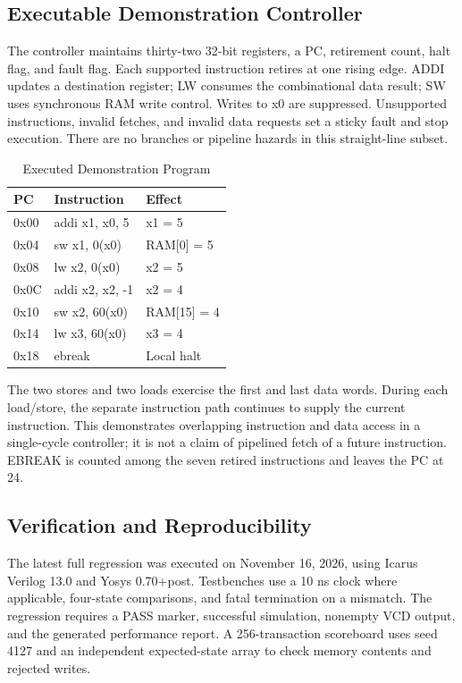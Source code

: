\documentclass[conference,letterpaper]{IEEEtran}
\begin{document}
\subsection{Executable Demonstration Controller}

The controller maintains thirty-two 32-bit registers, a PC, retirement count, halt flag, and fault flag. Each supported instruction retires at one rising edge. ADDI updates a destination register; LW consumes the combinational data result; SW uses synchronous RAM write control. Writes to x0 are suppressed. Unsupported instructions, invalid fetches, and invalid data requests set a sticky fault and stop execution. There are no branches or pipeline hazards in this straight-line subset.

\begin{table}[!t]
\caption{Executed Demonstration Program}
\label{tab:II}
\centering\footnotesize
\renewcommand{\arraystretch}{1.15}
\setlength{\tabcolsep}{3pt}
\begin{tabularx}{\columnwidth}{YZZ}
\toprule
\textbf{PC} & \textbf{Instruction} & \textbf{Effect} \\
\midrule
0x00 & addi x1, x0, 5 & x1 = 5 \\
0x04 & sw x1, 0(x0) & RAM[0] = 5 \\
0x08 & lw x2, 0(x0) & x2 = 5 \\
0x0C & addi x2, x2, -1 & x2 = 4 \\
0x10 & sw x2, 60(x0) & RAM[15] = 4 \\
0x14 & lw x3, 60(x0) & x3 = 4 \\
0x18 & ebreak & Local halt \\
\bottomrule
\end{tabularx}
\end{table}

The two stores and two loads exercise the first and last data words. During each load/store, the separate instruction path continues to supply the current instruction. This demonstrates overlapping instruction and data access in a single-cycle controller; it is not a claim of pipelined fetch of a future instruction. EBREAK is counted among the seven retired instructions and leaves the PC at 24.

\subsection{Verification and Reproducibility}

The latest full regression was executed on November 16, 2026, using Icarus Verilog 13.0 and Yosys 0.70+post. Testbenches use a 10 ns clock where applicable, four-state comparisons, and fatal termination on a mismatch. The regression requires a PASS marker, successful simulation, nonempty VCD output, and the generated performance report. A 256-transaction scoreboard uses seed 4127 and an independent expected-state array to check memory contents and rejected writes.
\end{document}
